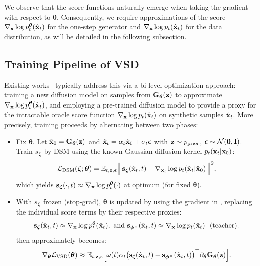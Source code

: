 We observe that the score functions naturally emerge when taking the gradient
with respect to $\bm{\theta}$. Consequently, we require approximations of
the score $\nabla_{{\mathbf{x}}}\log p_t^{\bm{\theta}}(\hat{{\mathbf{x}}}_t)$ for the
one-step generator and $\nabla_{{\mathbf{x}}}\log p_t(\hat{{\mathbf{x}}}_t)$ for the data
distribution, as will be detailed in the following subsection.








\subsection{Training Pipeline of VSD}\label{subsec:vsd-training}
Existing works~\citep{yin2024one,yin2024improved,pooledreamfusion,wang2023prolificdreamer,luo2023diff,lu2024simplifying} typically address this via a bi-level optimization approach: training a new diffusion model on samples from ${\mathbf{G}}_{\bm{\theta}}({\mathbf{z}})$ to approximate $\nabla_{{\mathbf{x}}} \log p_t^{\bm{\theta}}(\hat{{\mathbf{x}}}_t)$, and employing a pre-trained diffusion model to provide a proxy for the intractable oracle score function $\nabla_{{\mathbf{x}}} \log p_t(\hat{{\mathbf{x}}}_t)$ on synthetic samples $\hat{{\mathbf{x}}}_t$. More precisely, training proceeds by alternating between two phases:
\begin{itemize}
    \item {} Fix $\bm{\theta}$. Let $\hat{{\mathbf{x}}}_0={\mathbf{G}}_{\bm{\theta}}({\mathbf{z}})$ and
    $\hat{{\mathbf{x}}}_t=\alpha_t \hat{{\mathbf{x}}}_0+\sigma_t{\bm{\epsilon}}$ with ${\mathbf{z}}\sim p_{\mathrm{prior}}$, ${\bm{\epsilon}}\sim\mathcal{N}(\bm{0},{\mathbf{I}})$.
    Train $s_{\bm{\zeta}}$ by DSM using the known Gaussian diffusion kernel $p_t({\mathbf{x}}_t|{\mathbf{x}}_0)$:
    \[
    \mathcal{L}_{\text{DSM}}(\bm{\zeta};\bm{\theta})
    =\mathbb{E}_{t,{\mathbf{z}},{\bm{\epsilon}}}\Big\|\,{\mathbf{s}}_{\bm{\zeta}}(\hat{{\mathbf{x}}}_t,t)
    - \nabla_{{\mathbf{x}}_t}\log p_t(\hat{{\mathbf{x}}}_t|\hat{{\mathbf{x}}}_0)\,\Big\|^2,
    \]
    which yields ${\mathbf{s}}_{\bm{\zeta}}(\cdot,t)\approx \nabla_{{\mathbf{x}}}\log p_t^{\bm{\theta}}(\cdot)$ at optimum (for fixed $\bm{\theta}$).
    

  \item {} With $s_{\bm{\zeta}}$ frozen (stop-grad),  $\bm{\theta}$ is updated by using the gradient in , replacing the individual score terms by their respective proxies:
  \[
    {\mathbf{s}}_{\bm{\zeta}}(\hat{{\mathbf{x}}}_t,t)\approx \nabla_{{\mathbf{x}}}\log p_t^{\bm{\theta}}(\hat{{\mathbf{x}}}_t), \,\, \text{and} \,\, {\mathbf{s}}_{\bm{\phi}^\times}(\hat{{\mathbf{x}}}_t,t)\approx \nabla_{{\mathbf{x}}}\log p_t(\hat{{\mathbf{x}}}_t)\ \ \text{(teacher)}.
  \]
   then approximately becomes:
  \[
    \nabla_{\bm{\theta}}\mathcal{L}_{\text{VSD}}(\bm{\theta})
    \approx \mathbb{E}_{t,{\mathbf{z}},\bm{\epsilon}}\Big[\omega(t)\alpha_t
      \big({\mathbf{s}}_{\bm{\zeta}}(\hat{{\mathbf{x}}}_t,t) - {\mathbf{s}}_{\bm{\phi}^\times}(\hat{{\mathbf{x}}}_t,t)\big)^{\top}
      \partial_{\bm{\theta}}{\mathbf{G}}_{\bm{\theta}}({\mathbf{z}})
    \Big].
  \]
\end{itemize}
